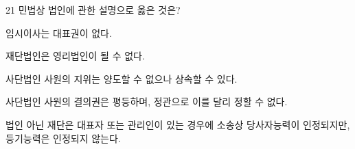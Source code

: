 \begin{question}{21}
민법상 법인에 관한 설명으로 옳은 것은?
\begin{choices}
  \item 임시이사는 대표권이 없다.
  \item 재단법인은 영리법인이 될 수 없다.
  \item 사단법인 사원의 지위는 양도할 수 없으나 상속할 수 있다.
  \item 사단법인 사원의 결의권은 평등하며, 정관으로 이를 달리 정할 수 없다.
  \item 법인 아닌 재단은 대표자 또는 관리인이 있는 경우에 소송상 당사자능력이 인정되지만, 등기능력은 인정되지 않는다.
\end{choices}
\end{question}
